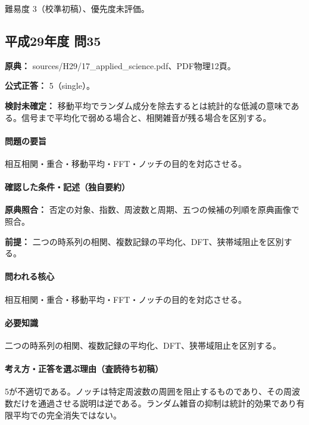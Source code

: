 \par 難易度 3（校準初稿）、優先度未評価。

\subsection{平成29年度 問35}
\label{q:h29-reg-applied-35}

\noindent\textbf{原典：} sources/H29/17\_applied\_science.pdf、PDF物理12頁。

\textbf{公式正答：} 5（single）。

\par\textbf{検討未確定：} 移動平均でランダム成分を除去するとは統計的な低減の意味である。信号まで平均化で弱める場合と、相関雑音が残る場合を区別する。

\paragraph{問題の要旨} 相互相関・重合・移動平均・FFT・ノッチの目的を対応させる。

\paragraph{確認した条件・記述（独自要約）}\mbox{}\par

\noindent\textbf{原典照合：} 否定の対象、指数、周波数と周期、五つの候補の列順を原典画像で照合。\par

\noindent\textbf{前提：} 二つの時系列の相関、複数記録の平均化、DFT、狭帯域阻止を区別する。\par

\paragraph{問われる核心} 相互相関・重合・移動平均・FFT・ノッチの目的を対応させる。

\paragraph{必要知識} 二つの時系列の相関、複数記録の平均化、DFT、狭帯域阻止を区別する。

\paragraph{考え方・正答を選ぶ理由（査読待ち初稿）} 5が不適切である。ノッチは特定周波数の周囲を阻止するものであり、その周波数だけを通過させる説明は逆である。ランダム雑音の抑制は統計的効果であり有限平均での完全消失ではない。

